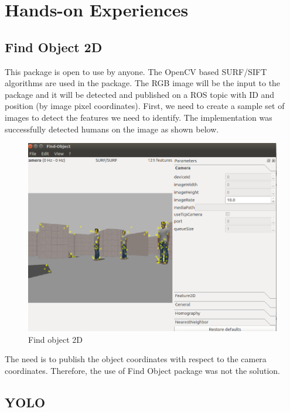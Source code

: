 \documentclass[twoside,12pt,times,onecolumn,a4paper]{report}
\begin{document}
\chapter{Hands-on Experiences}

\section{Find Object 2D}

This package is open to use by anyone. The OpenCV based SURF/SIFT algorithms are used in the package. The RGB image will be the input to the package and it will be detected and published on a ROS topic with ID and position (by image pixel coordinates). First, we need to create a sample set of images to detect the features we need to identify. The implementation was successfully detected humans on the image as shown below.

\begin{figure}[H]
  \centering
   \includegraphics[width=12cm]{object_detection-fo2d}
  \caption{Find object 2D}
\end{figure}

The need is to publish the object coordinates with respect to the camera 
coordinates. Therefore, the use of Find Object package was not the solution.

\section{YOLO}
\end{document}
